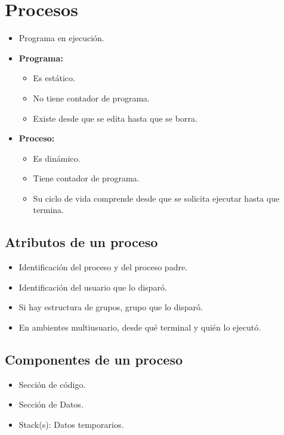 \pagebreak

\section{Procesos}
\begin{itemize}
    \item Programa en ejecución.
    \item \textbf{Programa:}
        \begin{itemize}
            \item Es estático.
            \item No tiene contador de programa.
            \item Existe desde que se edita hasta que se borra.
        \end{itemize}
    \item \textbf{Proceso:}
        \begin{itemize}
            \item Es dinámico.
            \item Tiene contador de programa.
            \item Su ciclo de vida comprende desde que se solicita ejecutar hasta que termina.
        \end{itemize}
\end{itemize}

\subsection{Atributos de un proceso}
\begin{itemize}
    \item Identificación del proceso y del proceso padre.
    \item Identificación del usuario que lo disparó.
    \item Si hay estructura de grupos, grupo que lo disparó.
    \item En ambientes multiusuario, desde qué terminal y quién lo ejecutó.
\end{itemize}

\subsection{Componentes de un proceso}
\begin{itemize}
    \item Sección de código.
    \item Sección de Datos.
    \item Stack(s): Datos temporarios.
\end{itemize}

